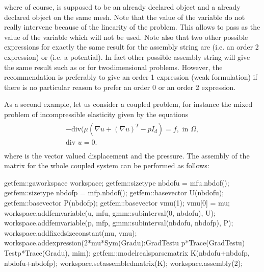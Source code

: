 \documentclass[a4paper,11pt,english]{sphinxmanual}
\begin{document}
where of course,  is supposed to be an already declared  object and  a already declared  object on the same mesh. Note that the value of the variable do not really intervene because of the linearity of the problem. This allows to pass  as the value of the variable which will not be used. Note also that two other possible expressions for exactly the same result for the assembly string are  (i.e. an order 2 expression) or  (i.e. a potential). In fact other possible assembly string will give the same result such as  or  for two\sphinxhyphen{}dimensional problems. However, the recommendation is preferably to give an order 1 expression (weak formulation) if there is no particular reason to prefer an order 0 or an order 2 expression.

As a second example, let us consider a coupled problem, for instance the mixed problem of incompressible elasticity given by the equations
\begin{align*}\!\begin{aligned}
-\mbox{div}(\mu(\nabla u + (\nabla u)^T - p I_d)  = f, \mbox{ in } \Omega,\\
\mbox{div } u = 0.\\
\end{aligned}\end{align*}
where  is the vector valued displacement and  the pressure. The assembly of the matrix for the whole coupled system can be performed as follows:

\begin{sphinxVerbatim}[commandchars=\\\{\}]
getfem::ga\PYGZus{}workspace workspace;
getfem::size\PYGZus{}type nbdofu = mf\PYGZus{}u.nb\PYGZus{}dof();
getfem::size\PYGZus{}type nbdofp = mf\PYGZus{}p.nb\PYGZus{}dof();
getfem::base\PYGZus{}vector U(nbdofu);
getfem::base\PYGZus{}vector P(nbdofp);
getfem::base\PYGZus{}vector vmu(1); vmu[0] = mu;
workspace.add\PYGZus{}fem\PYGZus{}variable(\PYGZdq{}u\PYGZdq{}, mf\PYGZus{}u, gmm::sub\PYGZus{}interval(0, nbdofu), U);
workspace.add\PYGZus{}fem\PYGZus{}variable(\PYGZdq{}p\PYGZdq{}, mf\PYGZus{}p, gmm::sub\PYGZus{}interval(nbdofu, nbdofp), P);
workspace.add\PYGZus{}fixed\PYGZus{}size\PYGZus{}constant(\PYGZdq{}mu\PYGZdq{}, vmu);
workspace.add\PYGZus{}expression(\PYGZdq{}2*mu*Sym(Grad\PYGZus{}u):Grad\PYGZus{}Test\PYGZus{}u\PYGZdq{}
                      \PYGZdq{}\PYGZhy{} p*Trace(Grad\PYGZus{}Test\PYGZus{}u) \PYGZhy{} Test\PYGZus{}p*Trace(Grad\PYGZus{}u)\PYGZdq{}, mim);
getfem::model\PYGZus{}real\PYGZus{}sparse\PYGZus{}matrix K(nbdofu+nbdofp, nbdofu+nbdofp);
workspace.set\PYGZus{}assembled\PYGZus{}matrix(K);
workspace.assembly(2);
\end{sphinxVerbatim}
\end{document}
